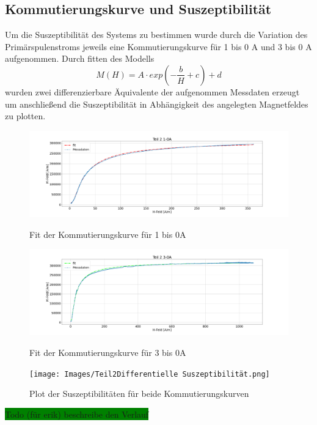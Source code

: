     \subsection{Kommutierungskurve und Suszeptibilität}
        Um die Suszeptibilität des Systems zu bestimmen wurde durch die Variation des Primärspulenstroms jeweils eine Kommutierungskurve für 1 bis 0 A und 3 bis 0 A aufgenommen.
        Durch fitten des Modells 
        \begin{equation}
            M(H) = A \cdot exp(-\frac{b}{H} + c) + d
        \end{equation}
        wurden zwei differenzierbare Äquivalente der aufgenommen Messdaten erzeugt um anschließend die Suszeptibilität in Abhängigkeit des angelegten Magnetfeldes zu plotten.
        \begin{figure}[ht]
            \centering
            \includegraphics[width=\textwidth]{Images/Teil2Teil 2 1-0A.png}
            \label{Teil2-1A}
            \caption{Fit der Kommutierungskurve für 1 bis 0A}
        \end{figure}
        \begin{figure}[ht]
            \centering
            \includegraphics[width=\textwidth]{Images/Teil2Teil 2 3-0A.png}
            \label{Teil2-3A}
            \caption{Fit der Kommutierungskurve für 3 bis 0A}
        \end{figure}
        \begin{figure}[ht]
            \centering
            \texttt{[image: Images/Teil2Differentielle Suszeptibilität.png]}
            \label{DiffSus}
            \caption{Plot der Suszeptibilitäten für beide Kommutierungskurven}
        \end{figure}
        \colorbox{green}{Todo (für erik) beschreibe den Verlauf}
